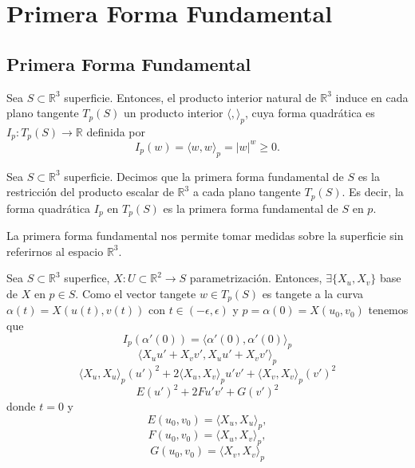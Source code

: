 \chapter{Primera Forma Fundamental}

\section{Primera Forma Fundamental}

\begin{prop}
  Sea $S \subset \mathbb{R}^{3}$ superficie. Entonces, el producto interior natural de $\mathbb{R}^{3}$ induce en cada plano tangente $T_{p}(S)$ un producto interior $\langle  { , } \rangle_{p}$, cuya forma quadrática es $I_{p} : T_{p}(S) \to \mathbb{R}$ definida por
  \[ 
    I_{p}(w) = \langle w{ , }w \rangle_{p} = | w |^{w} \geq 0.
  \] 
\end{prop}

\begin{defn}
  Sea $S \subset \mathbb{R}^{3}$ superficie. Decimos que la primera forma fundamental de $S$ es la restricción del producto escalar de $\mathbb{R}^{3}$ a cada plano tangente $T_{p}(S)$. Es decir, la forma quadrática $I_{p}$ en $T_{p}(S)$ es la primera forma fundamental de $S$ en $p$.
\end{defn}

\begin{obs}
  La primera forma fundamental nos permite tomar medidas sobre la superficie sin referirnos al espacio $\mathbb{R}^{3}$.
\end{obs}

\begin{note}
  Sea $S \subset \mathbb{R}^{3}$ superfice, $X : U \subset \mathbb{R}^{2} \to S$ parametrización. Entonces, $\exists \{ X_{u}, X_{v} \}$ base de $X$ en $p \in S$. Como el vector tangete $w \in T_{p}(S)$ es tangete a la curva $\alpha(t) = X(u(t), v(t))$ con $t \in (-\epsilon, \epsilon)$ y $p = \alpha(0) = X(u_{0}, v_{0})$ tenemos que
  \[ 
    I_{p}(\alpha'(0)) = \langle \alpha'(0){ , }\alpha'(0) \rangle_{p}
  \] 
  \[ 
    \langle X_{u}u' + X_{v}v'{ , } X_{u}u' + X_{v}v' \rangle_{p}
  \] 
  \[ 
    \langle X_{u}{ , }X_{u} \rangle_{p}(u')^{2} + 2 \langle X_{u}{ , }X_{v} \rangle_{p} u' v' + \langle X_{v}{ , }X_{v} \rangle_{p}(v')^{2} 
  \]
  \[ 
    E(u')^{2} + 2 F u' v' + G(v')^{2} 
  \] 
  donde $t = 0$ y 
  \[ 
    E(u_{0}, v_{0}) = \langle X_{u}{ , }X_{u} \rangle_{p},
  \] 
  \[ 
    F(u_{0}, v_{0}) = \langle X_{u}{ , }X_{v} \rangle_{p}, 
  \] 
  \[ 
    G(u_{0}, v_{0}) = \langle X_{v}{ , }X_{v} \rangle_{p} 
  \] 
\end{note}

